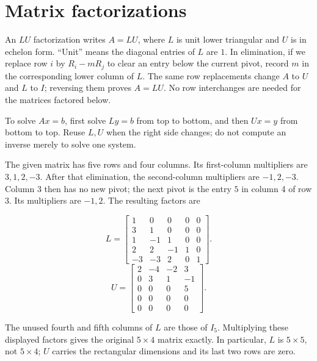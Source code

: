 \section{Matrix factorizations}
An $LU$ factorization writes $A=LU$, where $L$ is unit lower
triangular and $U$ is in echelon form. ``Unit'' means the diagonal
entries of $L$ are $1$. In elimination, if we replace row $i$ by
$R_i-mR_j$ to clear an entry below the current pivot, record $m$
in the corresponding lower column of $L$. The same row replacements
change $A$ to $U$ and $L$ to $I$; reversing them proves $A=LU$.
No row interchanges are needed for the matrices factored below.

To solve $Ax=b$, first solve $Ly=b$ from top to bottom, and then
$Ux=y$ from bottom to top. Reuse $L,U$ when the right side changes;
do not compute an inverse merely to solve one system.

The given matrix has five rows and four columns. Its first-column
multipliers are $3,1,2,-3$. After that elimination, the second-column
multipliers are $-1,2,-3$. Column 3 then has no new pivot; the next
pivot is the entry $5$ in column 4 of row 3. Its multipliers are $-1,2$.
The resulting factors are

\[L=\left[\begin{matrix}1 & 0 & 0 & 0 & 0\\3 & 1 & 0 & 0 & 0\\1 & -1 & 1 & 0 & 0\\2 & 2 & -1 & 1 & 0\\-3 & -3 & 2 & 0 & 1\end{matrix}\right].\]
\[U=\left[\begin{matrix}2 & -4 & -2 & 3\\0 & 3 & 1 & -1\\0 & 0 & 0 & 5\\0 & 0 & 0 & 0\\0 & 0 & 0 & 0\end{matrix}\right].\]

The unused fourth and fifth columns of $L$ are those of $I_5$.
Multiplying these displayed factors gives the original $5\times4$
matrix exactly. In particular, $L$ is $5\times5$, not $5\times4$;
$U$ carries the rectangular dimensions and its last two rows are zero.

